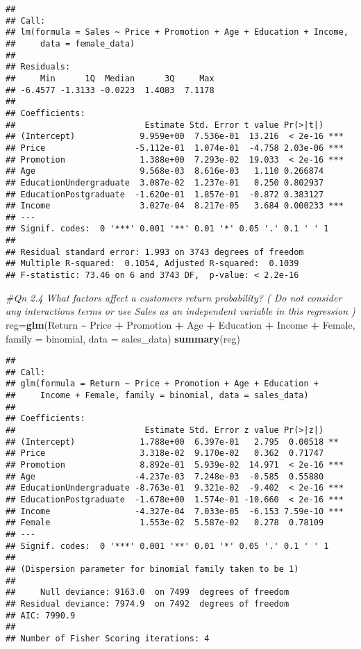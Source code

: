 \documentclass[
]{article}
\newenvironment{Shaded}{\begin{snugshade}}{\end{snugshade}}
\newcommand{\AttributeTok}[1]{\textcolor[rgb]{0.13,0.29,0.53}{#1}}
\newcommand{\CommentTok}[1]{\textcolor[rgb]{0.56,0.35,0.01}{\textit{#1}}}
\newcommand{\FunctionTok}[1]{\textcolor[rgb]{0.13,0.29,0.53}{\textbf{#1}}}
\newcommand{\NormalTok}[1]{#1}
\newcommand{\OtherTok}[1]{\textcolor[rgb]{0.56,0.35,0.01}{#1}}
\newcommand{\SpecialCharTok}[1]{\textcolor[rgb]{0.81,0.36,0.00}{\textbf{#1}}}
\begin{document}
\begin{verbatim}
## 
## Call:
## lm(formula = Sales ~ Price + Promotion + Age + Education + Income, 
##     data = female_data)
## 
## Residuals:
##     Min      1Q  Median      3Q     Max 
## -6.4577 -1.3133 -0.0223  1.4083  7.1178 
## 
## Coefficients:
##                          Estimate Std. Error t value Pr(>|t|)    
## (Intercept)             9.959e+00  7.536e-01  13.216  < 2e-16 ***
## Price                  -5.112e-01  1.074e-01  -4.758 2.03e-06 ***
## Promotion               1.388e+00  7.293e-02  19.033  < 2e-16 ***
## Age                     9.568e-03  8.616e-03   1.110 0.266874    
## EducationUndergraduate  3.087e-02  1.237e-01   0.250 0.802937    
## EducationPostgraduate  -1.620e-01  1.857e-01  -0.872 0.383127    
## Income                  3.027e-04  8.217e-05   3.684 0.000233 ***
## ---
## Signif. codes:  0 '***' 0.001 '**' 0.01 '*' 0.05 '.' 0.1 ' ' 1
## 
## Residual standard error: 1.993 on 3743 degrees of freedom
## Multiple R-squared:  0.1054, Adjusted R-squared:  0.1039 
## F-statistic: 73.46 on 6 and 3743 DF,  p-value: < 2.2e-16
\end{verbatim}

\begin{Shaded}
\begin{Highlighting}[]
\CommentTok{\#Qn 2.4 What factors affect a customer\textquotesingle{}s return probability? ( Do not consider any interactions terms or use Sales as an independent variable in this regression )}
\NormalTok{reg}\OtherTok{=}\FunctionTok{glm}\NormalTok{(Return }\SpecialCharTok{\textasciitilde{}}\NormalTok{ Price }\SpecialCharTok{+}\NormalTok{ Promotion }\SpecialCharTok{+}\NormalTok{ Age }\SpecialCharTok{+}\NormalTok{ Education }\SpecialCharTok{+}\NormalTok{ Income }\SpecialCharTok{+}\NormalTok{ Female, }\AttributeTok{family =}\NormalTok{ binomial, }\AttributeTok{data =}\NormalTok{ sales\_data)}
\FunctionTok{summary}\NormalTok{(reg)}
\end{Highlighting}
\end{Shaded}

\begin{verbatim}
## 
## Call:
## glm(formula = Return ~ Price + Promotion + Age + Education + 
##     Income + Female, family = binomial, data = sales_data)
## 
## Coefficients:
##                          Estimate Std. Error z value Pr(>|z|)    
## (Intercept)             1.788e+00  6.397e-01   2.795  0.00518 ** 
## Price                   3.318e-02  9.170e-02   0.362  0.71747    
## Promotion               8.892e-01  5.939e-02  14.971  < 2e-16 ***
## Age                    -4.237e-03  7.248e-03  -0.585  0.55880    
## EducationUndergraduate -8.763e-01  9.321e-02  -9.402  < 2e-16 ***
## EducationPostgraduate  -1.678e+00  1.574e-01 -10.660  < 2e-16 ***
## Income                 -4.327e-04  7.033e-05  -6.153 7.59e-10 ***
## Female                  1.553e-02  5.587e-02   0.278  0.78109    
## ---
## Signif. codes:  0 '***' 0.001 '**' 0.01 '*' 0.05 '.' 0.1 ' ' 1
## 
## (Dispersion parameter for binomial family taken to be 1)
## 
##     Null deviance: 9163.0  on 7499  degrees of freedom
## Residual deviance: 7974.9  on 7492  degrees of freedom
## AIC: 7990.9
## 
## Number of Fisher Scoring iterations: 4
\end{verbatim}
\end{document}
